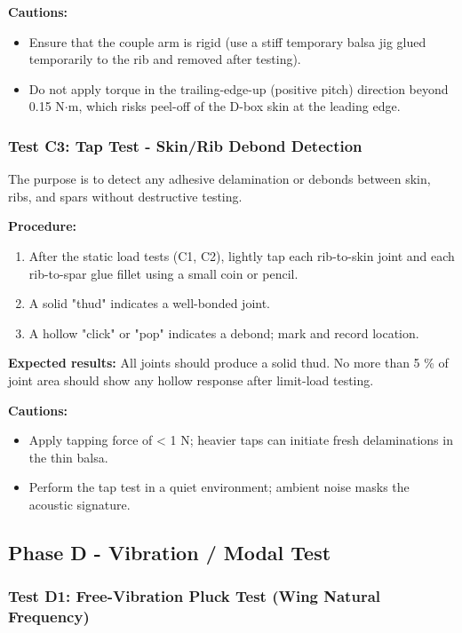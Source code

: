 \documentclass[10pt,a4paper]{article}
\begin{document}
\textbf{Cautions:}
\begin{itemize}[noitemsep,topsep=2pt]
\item Ensure that the couple arm is rigid (use a stiff temporary balsa jig glued temporarily to the rib and removed after testing).
\item Do not apply torque in the trailing-edge-up (positive pitch) direction beyond 0.15 N${\cdot}$m, which risks peel-off of the D-box skin at the leading edge.
\end{itemize}

\subsubsection{Test C3: Tap Test - Skin/Rib Debond Detection}

The purpose is to detect any adhesive delamination or debonds between skin, ribs, and spars without destructive testing.

\textbf{Procedure:}
\begin{enumerate}[noitemsep,topsep=2pt]
\item After the static load tests (C1, C2), lightly tap each rib-to-skin joint and each rib-to-spar glue fillet using a small coin or pencil.
\item A solid "thud" indicates a well-bonded joint.
\item A hollow "click" or "pop" indicates a debond; mark and record location.
\end{enumerate}

\textbf{Expected results:} All joints should produce a solid thud. No more than 5 \% of joint area should show any hollow response after limit-load testing.

\textbf{Cautions:}
\begin{itemize}[noitemsep,topsep=2pt]
\item Apply tapping force of < 1 N; heavier taps can initiate fresh delaminations in the thin balsa.
\item Perform the tap test in a quiet environment; ambient noise masks the acoustic signature.
\end{itemize}

\subsection{Phase D - Vibration / Modal Test}

\subsubsection{Test D1: Free-Vibration Pluck Test (Wing Natural Frequency)}
\end{document}
